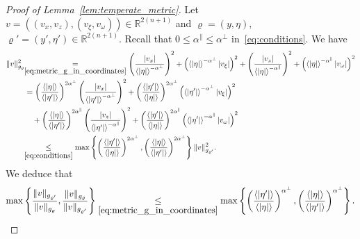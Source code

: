 \documentclass[AHL,Unicode,longabstracts,published]{cedram}
\newcommand{\bbR}{\mathbb{R}}
\newcommand{\bbR}{\mathbb{R}}
\begin{document}
\begin{proof}[Proof of Lemma~\ref{lem:temperate_metric}]
Let $v=((v_{x},v_{z}),(v_{\xi},v_{\omega}))\in\bbR^{2(n+1)}$ and $\varrho=(y,\eta),$ $\varrho'=(y',\eta')\in\bbR^{2(n+1)}$. Recall that $0\leq\alpha^{\parallel}\leq\alpha^{\perp}$ in~\eqref{eq:conditions}. We have
\begin{align*}
\|v\|_{g_{\varrho}}^{2} &\!\!\underset{\eqref{eq:metric_g_in_coordinates}}{=} \left(\frac{\left|v_{x}\right|}{\left\langle \left|\eta\right|\right\rangle ^{-\alpha^{\perp}}}\right)^{2}+\left(\left\langle \left|\eta\right|\right\rangle ^{-\alpha^{\perp}}\left|v_{\xi}\right|\right)^{2}+\left(\frac{\left|v_{z}\right|}{\left\langle \left|\eta\right|\right\rangle ^{-\alpha^{\parallel}}}\right)^{2}+\left(\left\langle \left|\eta\right|\right\rangle ^{-\alpha^{\parallel}}\left|v_{\omega}\right|\right)^{2}\\
&= \left(\frac{\left\langle \left|\eta\right|\right\rangle }{\left\langle \left|\eta'\right|\right\rangle }\right)^{2\alpha^{\perp}}\left(\frac{\left|v_{x}\right|}{\left\langle \left|\eta'\right|\right\rangle ^{-\alpha^{\perp}}}\right)^{2}+\left(\frac{\left\langle \left|\eta'\right|\right\rangle }{\left\langle \left|\eta\right|\right\rangle }\right)^{2\alpha^{\perp}}\left(\left\langle \left|\eta'\right|\right\rangle ^{-\alpha^{\perp}}\left|v_{\xi}\right|\right)^{2}\\
& \quad +\left(\frac{\left\langle \left|\eta\right|\right\rangle }{\left\langle \left|\eta'\right|\right\rangle }\right)^{2\alpha^{\parallel}}\left(\frac{\left|v_{z}\right|}{\left\langle \left|\eta'\right|\right\rangle ^{-\alpha^{\parallel}}}\right)^{2}+\left(\frac{\left\langle \left|\eta'\right|\right\rangle }{\left\langle \left|\eta\right|\right\rangle }\right)^{2\alpha^{\parallel}}\left(\left\langle \left|\eta'\right|\right\rangle ^{-\alpha^{\parallel}}\left|v_{\omega}\right|\right)^{2}\\
&\!\!\underset{\eqref{eq:conditions}}{\leq}  \max\left\{ \left(\frac{\langle|\eta'|\rangle}{\langle|\eta|\rangle}\right)^{2\alpha^{\perp}},\left(\frac{\langle|\eta|\rangle}{\langle|\eta'|\rangle}\right)^{2\alpha^{\perp}}\right\} \|v\|_{g_{\varrho'}}^{2}.
\end{align*}
We deduce that
\begin{equation}\label{eq:comparison}
\max\left\{ \frac{\|v\|_{g_{\varrho'}}}{\|v\|_{g_{\varrho}}},\frac{\|v\|_{g_{\varrho}}}{\|v\|_{g_{\varrho'}}}\right\} \underset{\eqref{eq:metric_g_in_coordinates}}{\leq}\max\left\{ \left(\frac{\langle|\eta'|\rangle}{\langle|\eta|\rangle}\right)^{\alpha^{\perp}},\left(\frac{\langle|\eta|\rangle}{\langle|\eta'|\rangle}\right)^{\alpha^{\perp}}\right\}.

\end{equation}
\end{proof}
\end{document}
